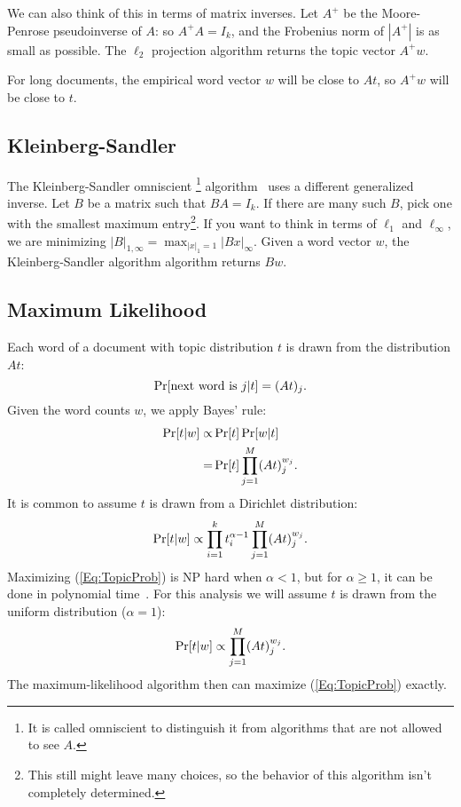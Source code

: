 \documentclass{article}
\begin{document}
We can also think of this in terms of matrix inverses.
Let \(A^+\) be the Moore-Penrose pseudoinverse of \(A\): so \(A^+A = I_k\), and the Frobenius norm of \(|A^+|\) is as small as possible.
The \(\ell_2\) projection algorithm returns the topic vector \(A^+w\).

For long documents, the empirical word vector \(w\) will be close to \(A t\), so \(A^+ w\) will be close to \(t\).

\subsection{Kleinberg-Sandler}

The Kleinberg-Sandler omniscient%
    \footnote{It is called omniscient to distinguish it from algorithms that are not allowed to see \(A\).}
    algorithm~\cite{kleinberg2004using} uses a different generalized inverse.
Let \(B\) be a matrix such that \(BA = I_k\).
If there are many such \(B\), pick one with the smallest maximum entry\footnote{%
    This still might leave many choices, so the behavior of this algorithm isn't completely determined.}.
If you want to think in terms of \(\ell_1\) and \(\ell_\infty\), we are minimizing \(|B|_{1,\infty} = \max_{|x|_1 = 1} |B x|_\infty\).
Given a word vector \(w\), the Kleinberg-Sandler algorithm algorithm returns \(Bw\).

\subsection{Maximum Likelihood}

Each word of a document with topic distribution \(t\) is drawn from the distribution \(A t\):
\[ \Pr[\text{next word is \(j\)} | t] = (A t)_j \ldotp \]
Given the word counts \(w\), we apply Bayes' rule:
\begin{align*}
    \Pr[t | w] \propto & \Pr[t] \Pr[w | t]
\\  = & \Pr[t] \prod_{j=1}^M (A t)_j^{w_j} \ldotp
\end{align*}
It is common to assume \(t\) is drawn from a Dirichlet distribution:
\begin{equation}
    \label{Eq:TopicProbWithAlpha}
    \Pr[t | w] \propto \prod_{i = 1}^k t_i^{\alpha - 1} \prod_{j=1}^M (A t)_j^{w_j} \ldotp
\end{equation}
Maximizing (\ref{Eq:TopicProb}) is NP hard when \(\alpha < 1\), but for \(\alpha \ge 1\), it can be done in polynomial time~\cite{conf/nips/SontagR11}.
For this analysis we will assume \(t\) is drawn from the uniform distribution (\(\alpha=1\)):
\begin{equation}
    \label{Eq:TopicProb}
    \Pr[t | w] \propto \prod_{j=1}^M (A t)_j^{w_j} \ldotp
\end{equation}
The maximum-likelihood algorithm then can maximize (\ref{Eq:TopicProb}) exactly.
\end{document}
